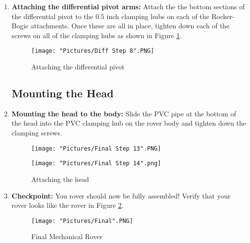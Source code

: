 \documentclass[12pt]{article}
\begin{document}
\begin{enumerate}
\item \textbf{Attaching the differential pivot arms:} Attach the the bottom sections of the differential pivot to the 0.5 inch clamping hubs on each of the Rocker-Bogie attachments. Once these are all in place, tighten down each of the screws on all of the clamping hubs as shown in Figure \ref{attaching diff pvt}.

\begin{figure}[H]
  \centering
  \begin{minipage}[b]{0.35\textwidth}
      \texttt{[image: "Pictures/Diff Step 8".PNG]}
  \end{minipage}
  \caption{Attaching the differential pivot}
  \label{attaching diff pvt}
\end{figure}

\subsection{Mounting the Head}

\item \textbf{Mounting the head to the body:} Slide the PVC pipe at the bottom of the head into the PVC clamping hub on the rover body and tighten down the clamping screws.

\begin{figure}[H]
  \centering
  \begin{minipage}[b]{0.45\textwidth}
    \texttt{[image: "Pictures/Final Step 13".PNG]}
  \end{minipage}
  \hfill
  \begin{minipage}[b]{0.45\textwidth}
    \texttt{[image: "Pictures/Final Step 14".png]}
  \end{minipage}
  \caption{Attaching the head}
\end{figure}

\item \textbf{Checkpoint:} You rover should now be fully assembled!  Verify that your rover looks like the rover in Figure \ref{final mechanical rover}.
\begin{figure}[H]
  \centering
    \texttt{[image: "Pictures/Final".PNG]}
  \caption{Final Mechanical Rover}
  \label{final mechanical rover}
\end{figure}

\end{enumerate}
\end{document}
